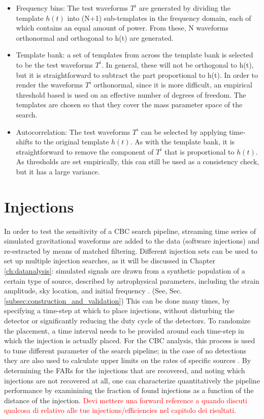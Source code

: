 \documentclass[binding=0.6cm, LaM]{sapthesis}
\newcommand{\fpg}[1]{\textcolor{red}{#1} }
\begin{document}
		\begin{itemize}
 			 \item Frequency bins: The test waveforms $T^i$ are generated by dividing the template $h(t)$ into (N+1) 
				  sub-templates in the frequency domain, each of which contains an equal amount of power. 
				  From these, N waveforms orthonormal and orthogonal to h(t) are generated. 
 			 \item Template bank: a set of templates from across the template bank is selected to be the test waveforms $T^i$.
				  In general, these will not be orthogonal to h(t), but it is straightforward to subtract the part proportional to h(t). 	
				  In order to render the waveforms $T^i$ orthonormal, since it is more difficult, 
				  an empirical threshold based is used on an effective number of degrees of freedom. 
				  The templates are chosen so that they cover the mass parameter space of the search. 
 			 \item Autocorrelation: The test waveforms $T^i$ can be selected by applying time-shifts to the original template  $h(t)$. 
				  As with the template bank, it is straightforward to remove the component of $T^i$ that is proportional to $h(t)$. 
				  As thresholds are set empirically, this can still be used as a consistency check, but it has a large variance. 
		\end{itemize}
\section{Injections}

        In order to test the sensitivity of a CBC search pipeline,
        streaming time series of simulated gravitational waveforms are added to the data (software injections)
        and re-estracted by means of matched filtering.
        Different injection sets can be used to set up multiple injection searches, as it will be discussed in Chapter \ref{ch:datanalysis}:
        simulated signals are drawn from a synthetic population of a certain type of source,
        described by astrophysical parameters, including the strain amplitude, sky location,
        and initial frequency \cite{30}. (See, Sec.\ref{subsec:construction_and_validation})
        This can be done many times, by specifying a time-step at which to place injections,
        without disturbing the detector or significantly reducing the duty cycle of the detectors.
        To randomize the placement, a time interval needs to be provided around
        each time-step in which the injection is actually placed.
        For the CBC analysis, this process is used to tune different parameter of the search pipeline;
        in the case of no detections they are also used to calculate upper limits on the rates of specific sources \cite{47}.
        By determining the FARs for the injections that are recovered,
        and noting which injections are not recovered at all,
        one can characterize quantitatively the pipeline performance \cite{47, 48}
        by examinining the fraction of found injections as a function of the distance of the injection.
\fpg{Devi mettere una forward reference a quando discuti qualcosa di relativo alle tue injections/efficiencies nel capitolo dei risultati.}
	
\end{document}
